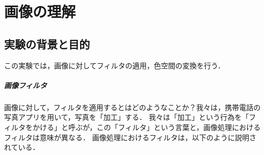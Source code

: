 \chapter{画像の理解}
\section{実験の背景と目的}
この実験では，画像に対してフィルタの適用，色空間の変換を行う．\par
\paragraph{画像フィルタ} 画像に対して，フィルタを適用するとはどのようなことか？我々は，携帯電話の写真アプリを用いて，写真を「加工」する．
我々は「加工」という行為を「フィルタをかける」と呼ぶが，この「フィルタ」という言葉と，画像処理におけるフィルタは意味が異なる．
画像処理におけるフィルタは，以下のように説明されている．


